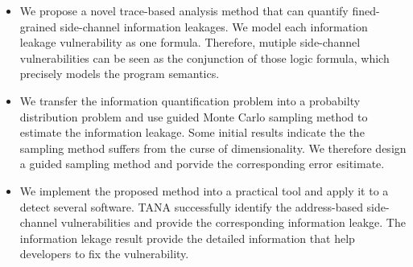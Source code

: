 \begin{itemize}
	\item We propose a novel trace-based analysis method that can quantify fined-grained side-channel
        information leakages. We model each information leakage vulnerability as one formula. Therefore,
        mutiple side-channel vulnerabilities can be seen as the conjunction of those logic formula, which
        precisely models the program semantics.
	\item We transfer the information quantification problem into a probabilty distribution problem and use guided Monte
        Carlo sampling method to estimate the information leakage. Some initial results indicate the 
        the sampling method suffers from the curse of dimensionality. We therefore design a guided
        sampling method and porvide the corresponding error esitimate.
	\item We implement the proposed method into a practical tool and apply it to a detect several software. TANA 
        successfully identify the address-based side-channel vulnerabilities and provide the corresponding
        information leakge. The information lekage result provide the detailed information that help developers
        to fix the vulnerability.
\end{itemize}




